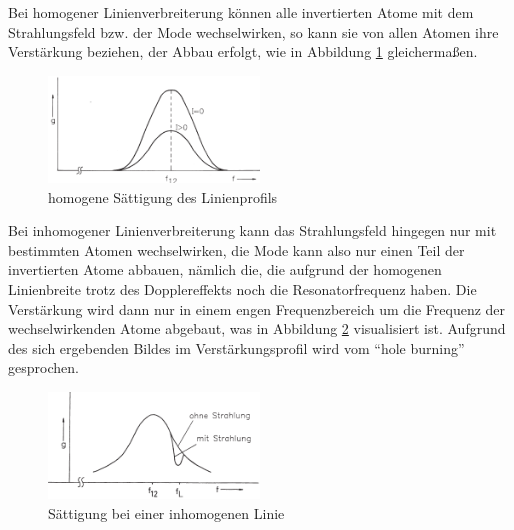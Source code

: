 \documentclass[a4paper,twoside,final]{article}
\begin{document}
Bei homogener Linienverbreiterung können alle invertierten Atome mit dem Strahlungsfeld bzw. der Mode wechselwirken, so kann sie von allen Atomen ihre Verstärkung beziehen, der Abbau erfolgt, wie in Abbildung \ref{fig:homogen} gleichermaßen.

\begin{figure}[htp]
    \centering
        \includegraphics[width=0.5\textwidth]{Bilder/Saettigung_homogen.pdf}
    \caption{homogene Sättigung des Linienprofils}
    \label{fig:homogen}
\end{figure}

Bei inhomogener Linienverbreiterung kann das Strahlungsfeld hingegen nur mit bestimmten Atomen wechselwirken, die Mode kann also nur einen Teil der invertierten Atome abbauen, nämlich die, die aufgrund der homogenen Linienbreite trotz des Dopplereffekts noch die Resonatorfrequenz haben. Die Verstärkung wird dann nur in einem engen Frequenzbereich um die Frequenz der wechselwirkenden Atome abgebaut, was in Abbildung \ref{fig:inhomogen} visualisiert ist. Aufgrund des sich ergebenden Bildes im Verstärkungsprofil wird vom ``hole burning'' gesprochen.

\begin{figure}[htp]
    \centering
        \includegraphics[width=0.5\textwidth]{Bilder/Saettigung_inhomogen.pdf}
    \caption{Sättigung bei einer inhomogenen Linie}
    \label{fig:inhomogen}
\end{figure}
\end{document}
